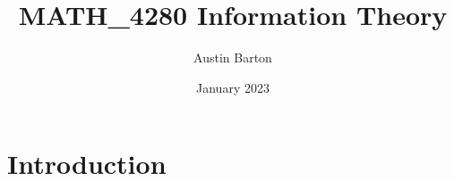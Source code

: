 \documentclass{article}
\title{MATH_4280 Information Theory}
\author{Austin Barton}
\date{January 2023}
\begin{document}
\maketitle

\section{Introduction}
\end{document}
